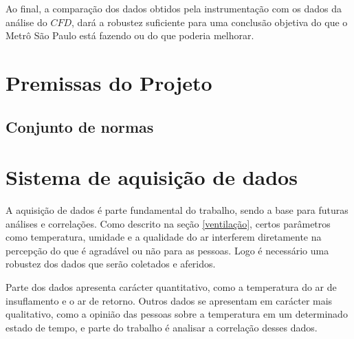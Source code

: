 \documentclass[acronym,symbols]{fei}
\begin{document}
Ao final, a comparação dos dados obtidos pela instrumentação com os dados da análise do $CFD$, dará a robustez suficiente para uma conclusão objetiva do que o Metrô São Paulo está fazendo ou do que poderia melhorar. 

\section{Premissas do Projeto}

\subsection{Conjunto de normas}



\section{Sistema de aquisição de dados}

A aquisição de dados é parte fundamental do trabalho, sendo a base para futuras análises e correlações. Como descrito na seção \ref{ventilação}, certos parâmetros como temperatura, umidade e a qualidade do ar interferem diretamente na percepção do que é agradável ou não para as pessoas. Logo é necessário uma robustez dos dados que serão coletados e aferidos.

Parte dos dados apresenta carácter quantitativo, como a temperatura do ar de insuflamento e o ar de retorno. Outros dados se apresentam em carácter mais qualitativo, como a opinião das pessoas sobre a temperatura em um determinado estado de tempo, e parte do trabalho é analisar a correlação desses dados.
\end{document}
